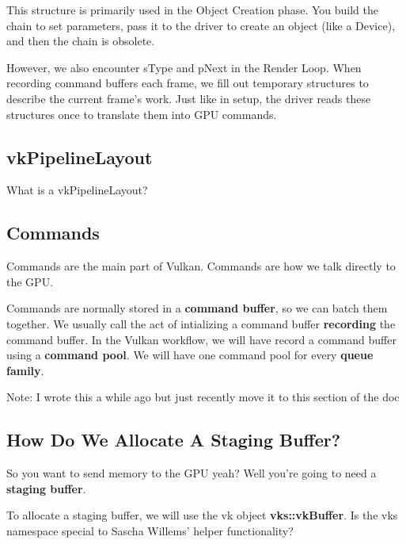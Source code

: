 \documentclass{article}
\begin{document}
\par This structure is primarily used in the Object Creation phase.
You build the chain to set parameters, pass it to the driver to
create an object (like a Device), and then the chain is obsolete.

\par However, we also encounter sType and pNext in the Render Loop.
When recording command buffers each frame, we fill out temporary
structures to describe the current frame's work. Just like in setup,
the driver reads these structures once to translate them into GPU commands.

\subsection*{vkPipelineLayout}
\par What is a vkPipelineLayout?

\subsection*{Commands}
\par Commands are the main part of Vulkan. Commands are how we talk
directly to the GPU.

\par Commands are normally stored in a \textbf{command buffer}, so we
can batch them together. We usually call the act of intializing a
command buffer \textbf{recording} the command buffer. In the Vulkan
workflow, we will have record a command buffer using a
\textbf{command pool}. We will have one command pool for every
\textbf{queue family}.

\par Note: I wrote this a while ago but just recently move it to this
section of the doc

\subsection*{How Do We Allocate A Staging
Buffer?}
\par So you want to send memory to the GPU yeah? Well you're going to
need a \textbf{staging buffer}.

\par To allocate a staging buffer, we will use the vk object
\textbf{vks::vkBuffer}. Is the vks namespace special to Sascha
Willems' helper functionality?
\end{document}
